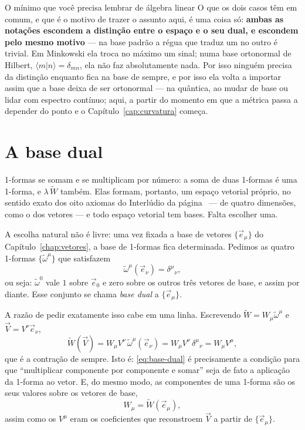 \documentclass[12pt,a4paper,oneside]{book}
\theoremstyle{rgplain}
\theoremstyle{rgremark}
\newcommand{\braket}[2]{\langle #1 \vert #2 \rangle}
\begin{document}
\begin{interludio}{O mínimo que você precisa lembrar de álgebra linear}
O que os dois casos têm em comum, e que é o motivo de trazer o assunto aqui,
é uma coisa só: \textbf{ambas as notações escondem a distinção entre o espaço e
o seu dual, e escondem pelo mesmo motivo} --- na base padrão a régua que
traduz um no outro é trivial. Em Minkowski ela troca no máximo um sinal; numa
base ortonormal de Hilbert, $\braket{m}{n}=\delta_{mn}$, ela não faz
absolutamente nada. Por isso ninguém precisa da distinção enquanto fica na base
de sempre, e por isso ela volta a importar assim que a base deixa de ser
ortonormal --- na quântica, ao mudar de base ou lidar com espectro contínuo;
aqui, a partir do momento em que a métrica passa a depender do ponto e o
Capítulo~\ref{cap:curvatura} começa.

\end{interludio}

\clearpage

\section{A base dual}
\label{sec:base-dual}

1-formas se somam e se multiplicam por número: a soma de duas 1-formas é uma
1-forma, e $\lambda\,\tilde W$ também. Elas formam, portanto, um espaço vetorial
próprio, no sentido exato dos oito axiomas do Interlúdio da
página~\pageref{sec:interludio-algebra} --- de quatro dimensões, como o dos
vetores --- e todo espaço vetorial tem bases. Falta escolher uma.

A escolha natural não é livre: uma vez fixada a base de vetores
$\{\vec e_\mu\}$ do Capítulo~\ref{chap:vetores}, a base de 1-formas fica
determinada. Pedimos as quatro 1-formas $\{\tilde\omega^\mu\}$ que satisfazem
\begin{equation}
  \tilde\omega^\mu(\vec e_\nu)=\delta^\mu{}_\nu ,
  \label{eq:base-dual}
\end{equation}
ou seja: $\tilde\omega^0$ vale $1$ sobre $\vec e_0$ e zero sobre os outros três
vetores de base, e assim por diante. Esse conjunto se chama \emph{base dual} a
$\{\vec e_\mu\}$.

A razão de pedir exatamente isso cabe em uma linha. Escrevendo
$\tilde W=W_\mu\tilde\omega^\mu$ e $\vec V=V^\nu\vec e_\nu$,
\[
  \tilde W(\vec V)=W_\mu V^\nu\,\tilde\omega^\mu(\vec e_\nu)
                =W_\mu V^\nu\,\delta^\mu{}_\nu
                =W_\mu V^\mu ,
\]
que é a contração de sempre. Isto é: \eqref{eq:base-dual} é precisamente a
condição para que ``multiplicar componente por componente e somar'' seja de
fato a aplicação da 1-forma ao vetor. E, do mesmo modo, as componentes de uma
1-forma são os seus valores sobre os vetores de base,
\[
  W_\mu=\tilde W(\vec e_\mu),
\]
assim como os $V^\mu$ eram os coeficientes que reconstroem $\vec V$ a partir
de $\{\vec e_\mu\}$.
\end{document}
